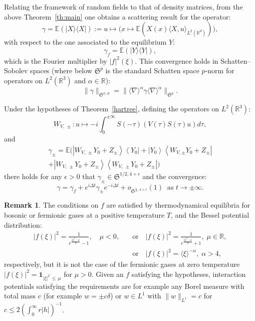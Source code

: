 \documentclass[10pt]{amsart}
\theoremstyle{definition}\newtheorem{defi}[theo]{Definition}\newtheorem{rema}[theo]{Remark}\newtheorem{exam}[theo]{Example}\newtheorem{exem}[theo]{Example}\newtheorem{nota}[theo]{Notation}
\newcommand{\R}{\mathbb{R}}
\newcommand{\E}{\mathbb{E}}
\newcommand{\frkS}{\mathfrak{S}}
\newcommand{\bfun}{\mathbf{1}}
\begin{document}
Relating the framework of random fields to that of density matrices, from the above Theorem~\ref{th:main} one obtains a scattering result for the operator:
\begin{equation} \label{def:gamma}
\gamma =\E (|X\rangle \langle X|):= u \mapsto \Big(x\mapsto \E \left(X(x) \langle X,u\rangle_{L^2\left(\R^d\right)}\right)\Big),
\end{equation}
with respect to the one associated to the equilibrium $Y$:
\begin{equation} \label{def:gammaf}
\gamma_f= \E (|Y\rangle \langle Y |),
\end{equation}
which is the Fourier multiplier by $|f|^2(\xi)$. This convergence holds in Schatten--Sobolev spaces (where below $\frkS^p$ is the standard Schatten space $p$-norm for operators on $L^2(\R^3)$ and $\alpha\in\R$):
\[
\| \gamma \|_{\frkS^{\alpha,\,p}}=\| \langle \nabla \rangle^{\alpha} \gamma \langle \nabla \rangle^{\alpha} \|_{\frkS^p}.
\]


\begin{coro}\label{corollaire}

Under the hypotheses of Theorem~\ref{hartree}, defining the operators on $L^{2}(\R^3)$:
\begin{equation}\label{def:WVpm}
W_{V,\,\pm}:u\mapsto-i\int_0^{\pm \infty} S(-\tau) (V(\tau) S(\tau)u)d\tau,
\end{equation} and
\begin{multline}\label{def:gammapm}
\gamma_\pm= \E\big(\left|W_{V,\,\pm}Y_0+Z_{\pm}\right\rangle \left\langle Y_0\right|+\left|Y_0 \right\rangle \left\langle W_{V,\pm}Y_0+Z_\pm\right|\\
+\left|W_{V,\,\pm}Y_0+Z_{\pm}\right\rangle \left\langle W_{V,\,\pm}Y_0+Z_\pm \right|\big)
\end{multline}
there holds for any $\epsilon>0$ that $\gamma_\pm \in \frkS^{1/2,4+\epsilon}$ and the convergence:
\[
\gamma=\gamma_f+e^{i\Delta t}\gamma_\pm e^{-i \Delta t}+o_{\frkS^{\frac 12,\,4+\epsilon}}(1) \ \text{ as } t\rightarrow \pm \infty.
\]
\end{coro}


\begin{rema}
The conditions on $f$ are satisfied by thermodynamical equilibria for bosonic or fermionic gases at a positive temperature $T$, and the Bessel potential distribution:
\begin{align*}
|f(\xi)|^2=\frac{1}{e^{\frac{|\xi|^2-\mu}{T}}-1}, \quad \mu <0, \quad &\text{or} \quad |f(\xi)|^2=\frac{1}{e^{\frac{|\xi|^2-\mu}{T}}+1}, \; \mu\in \R, \\ &\text{or} \quad |f(\xi)|^2=\langle \xi \rangle^{-\alpha}, \; \alpha >4,
\end{align*}
respectively, but it is not the case of the fermionic gases at zero temperature $|f(\xi)|^2=\bfun_{|\xi|^2\,\leq\,\mu}$ for $\mu>0$. Given an $f$ satisfying the hypotheses, interaction potentials satisfying the requirements are for example any Borel measure with total mass $c$ (for example $w=\pm c\delta$) or $w\in L^1$ with $\| w\|_{L^1}=c$ for $c\leq 2(\int_0^\infty r|h|)^{-1}$.
\end{rema}
\end{document}
